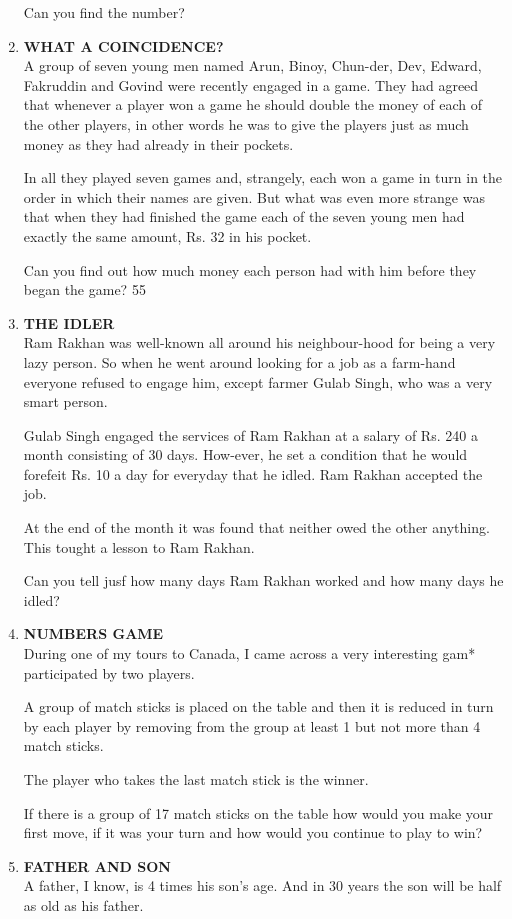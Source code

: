\documentclass[12pt]{article}
\begin{document}
\begin{enumerate}
Can you find  the number? 
%
\item \textbf{WHAT  A COINCIDENCE?} \\
A group  of seven  young  men  named  Arun,  Binoy,  Chun-der, Dev,  Edward,  Fakruddin  and  Govind  were  recently engaged  in a game.  They  had  agreed  that  whenever  a player  won  a game  he should  double  the money  of each of the  other  players,  in other  words  he was to give  the players  just as much  money  as they  had  already  in their pockets. 

In all they  played  seven  games  and,  strangely,  each won a game  in turn  in the order  in which  their  names  are given.  But  what  was  even  more  strange  was  that  when they had finished  the game  each  of the seven  young  men had exactly  the same  amount,  Rs. 32 in his pocket. 

Can you find  out how  much  money  each  person  had with him  before  they  began  the game? 
55 
%
\item \textbf{THE  IDLER} \\
Ram  Rakhan  was  well-known  all around  his neighbour-hood  for being  a very  lazy  person.  So  when  he went around  looking  for a job as a farm-hand  everyone  refused to engage  him,  except  farmer  Gulab  Singh,  who  was a very smart  person. 

Gulab  Singh  engaged  the services  of Ram  Rakhan  at a salary  of Rs. 240 a month  consisting  of 30 days.  How-ever,  he set a condition  that  he would  forefeit  Rs. 10 a day for everyday  that  he idled.  Ram  Rakhan  accepted the job. 

At the  end  of the  month  it was  found  that  neither owed  the other  anything.  This  tought  a lesson  to Ram Rakhan. 

Can you tell jusf how  many  days  Ram  Rakhan  worked and how  many  days  he idled?

%
\item \textbf{NUMBERS  GAME} \\ 
During  one of my tours  to Canada,  I came  across  a very interesting  gam*  participated  by two players. 

A group  of match  sticks  is placed  on the table  and then it is reduced  in turn  by each  player  by removing  from the group  at least  1 but not more  than  4 match  sticks. 

The player  who  takes  the  last  match  stick  is the winner. 

If there  is a group  of 17 match  sticks  on the table  how would  you  make  your  first  move,  if it was  your  turn  and how would  you continue  to play  to win? 
%
\item \textbf{FATHER  AND  SON} \\
A father,  I know,  is 4 times  his  son's  age.  And  in 30 years  the son will be half as old as his father. 


\end{enumerate}
\end{document}
